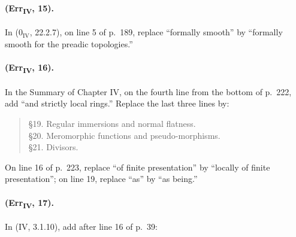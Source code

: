 \paragraph{(Err\textsubscript{IV}, 15).}
In ($0_{\mathrm{IV}}$, 22.2.7), on line 5 of p.~189, replace
``formally smooth'' by ``formally smooth for the preadic topologies.''

\paragraph{(Err\textsubscript{IV}, 16).}
In the Summary of Chapter IV, on the fourth line from the bottom of
p.~222, add ``and strictly local rings.''  Replace the last three lines
by:
\begin{quote}
\S19. Regular immersions and normal flatness.\\
\S20. Meromorphic functions and pseudo-morphisms.\\
\S21. Divisors.
\end{quote}
On line 16 of p.~223, replace ``of finite presentation'' by ``locally of
finite presentation''; on line 19, replace ``as'' by ``as being.''

\paragraph{(Err\textsubscript{IV}, 17).}
In (IV, 3.1.10), add after line 16 of p.~39:


